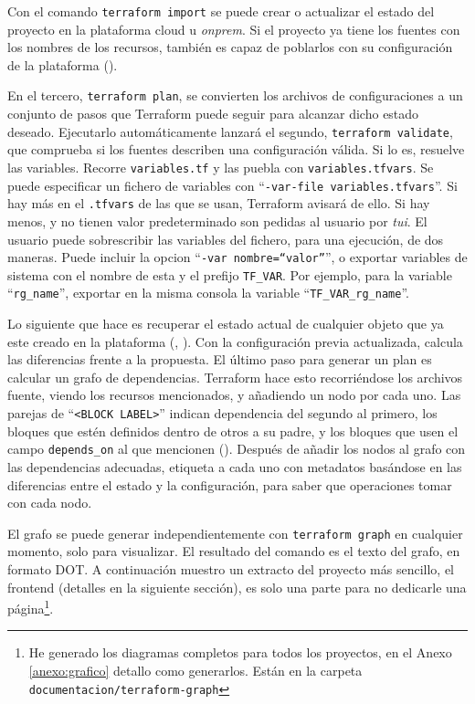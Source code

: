 \documentclass[11pt]{article}
\begin{document}
\begin{flushleft}
		Con el comando \texttt{terraform import} se puede crear o actualizar el estado del proyecto en la plataforma cloud u \textit{\gls{onprem}}. Si el proyecto ya tiene los fuentes con los nombres de los recursos, también es capaz de poblarlos con su configuración de la plataforma (\cite{hashicorp_import}).
		\linebreak
		
		En el tercero, \texttt{terraform plan}, se convierten los archivos de configuraciones a un conjunto de pasos que Terraform puede seguir para alcanzar dicho estado deseado. Ejecutarlo automáticamente lanzará el segundo, \texttt{terraform validate}, que comprueba si los fuentes describen una configuración válida. Si lo es, resuelve las variables. Recorre \texttt{variables.tf} y las puebla con \texttt{variables.tfvars}. Se puede especificar un fichero de variables con ``\texttt{-var-file variables.tfvars}''. Si hay más en el \texttt{.tfvars} de las que se usan, Terraform avisará de ello. Si hay menos, y no tienen valor predeterminado son pedidas al usuario por \textit{\acrshort{tui}}. El usuario puede sobrescribir las variables del fichero, para una ejecución, de dos maneras. Puede incluir la opcion ``\texttt{-var nombre=``valor''}'', o exportar variables de sistema con el nombre de esta y el prefijo \texttt{TF\_VAR}. Por ejemplo, para la variable ``\texttt{rg\_name}'', exportar en la misma consola la variable ``\texttt{TF\_VAR\_rg\_name}''.
		\linebreak
		
		Lo siguiente que hace es recuperar el estado actual de cualquier objeto que ya este creado en la plataforma (\cite{hashicorp_plan}, \cite{hashicorp_plan_refresh}). Con la configuración previa actualizada, calcula las diferencias frente a la propuesta. El último paso para generar un plan es calcular un grafo de dependencias. Terraform hace esto recorriéndose los archivos fuente, viendo los recursos mencionados, y añadiendo un nodo por cada uno. Las parejas de ``\texttt{<BLOCK LABEL>}'' indican dependencia del segundo al primero, los bloques que estén definidos dentro de otros a su padre, y los bloques que usen el campo \texttt{depends\_on} al que mencionen (\cite{hashicorp_graph}). Después de añadir los nodos al grafo con las dependencias adecuadas, etiqueta a cada uno con metadatos basándose en las diferencias entre el estado y la configuración, para saber que operaciones tomar con cada nodo. 
		\linebreak
		
		El grafo se puede generar independientemente con \texttt{terraform graph} en cualquier momento, solo para visualizar. El resultado del comando es el texto del grafo, en formato DOT. A continuación muestro un extracto del proyecto más sencillo, el frontend (detalles en la siguiente sección), es solo una parte para no dedicarle una página\footnote{He generado los diagramas completos para todos los proyectos, en el Anexo \ref{anexo:grafico} detallo como generarlos. Están en la carpeta \texttt{documentacion/terraform-graph}}. 
		\linebreak
		

\end{flushleft}
\end{document}
